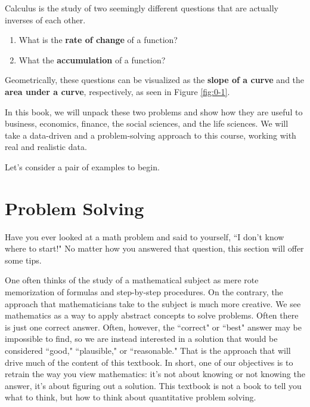 Calculus is the study of two seemingly different questions that are actually inverses of each other.
\begin{enumerate}
    \item What is the {\bf rate of change} of a function?
    \item What the {\bf accumulation} of a function?
\end{enumerate}
Geometrically, these questions can be visualized as the {\bf slope of a curve} and the {\bf area under a curve}, respectively, as seen in Figure \ref{fig:0-1}.

In this book, we will unpack these two problems and show how they are useful to business, economics, finance, the social sciences, and the life sciences. We will take a data-driven and a problem-solving approach to this course, working with real and realistic data.

Let's consider a pair of examples to begin.

\begin{example}

\end{example}

\begin{example}

\end{example}

\section{Problem Solving}
\label{sec:polya}

Have you ever looked at a math problem and said to yourself, ``I don't know where to start!" No matter how you answered that question, this section will offer some tips.

One often thinks of the study of a mathematical subject as mere rote memorization of formulas and step-by-step procedures. On the contrary, the approach that mathematicians take to the subject is much more creative. We see mathematics as a way to apply abstract concepts to solve problems. Often there is just one correct answer. Often, however, the ``correct" or ``best" answer may be impossible to find, so we are instead interested in a solution that would be considered ``good," ``plausible," or ``reasonable." That is the approach that will drive much of the content of this textbook. In short, one of our objectives is to retrain the way you view mathematics: it's not about knowing or not knowing the answer, it's about figuring out a solution. This textbook is not a book to tell you what to think, but how to think about quantitative problem solving.

